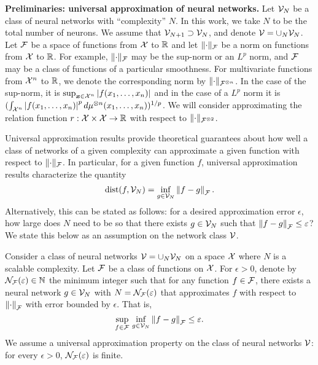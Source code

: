 \textbf{Preliminaries: universal approximation of neural networks.} Let ${\mathcal{V}}_N$ be a class of neural networks with ``complexity'' $N$. In this work, we take $N$ to be the total number of neurons. We assume that ${\mathcal{V}}_{N+1} \supset {\mathcal{V}}_N$, and denote ${\mathcal{V}} = \cup_N{{\mathcal{V}}_N}$. Let ${\mathcal{F}}$ be a space of functions from ${\mathcal{X}}$ to $\mathbb{R}$ and let $\lVert\cdot\rVert_{\mathcal{F}}$ be a norm on functions from ${\mathcal{X}}$ to $\mathbb{R}$. For example, $\lVert\cdot\rVert_{\mathcal{F}}$ may be the sup-norm or an $L^p$ norm, and ${\mathcal{F}}$ may be a class of functions of a particular smoothness. For multivariate functions from ${\mathcal{X}}^n$ to $\mathbb{R}$, we denote the corresponding norm by $\lVert\cdot\rVert_{{\mathcal{F}}^{\otimes n}}$. In the case of the sup-norm, it is $\sup_{\bm{x} \in {\mathcal{X}}^n} \left\lvert f(x_1, \ldots, x_n)\right\rvert$ and in the case of a $L^p$ norm it is $(\int_{{\mathcal{X}}^n} \left\lvert f(x_1, \ldots, x_n)\right\rvert^p d\mu^{\otimes n}(x_1, \ldots, x_n))^{1/p}$. We will consider approximating the relation function $r: {\mathcal{X}} \times {\mathcal{X}} \to \mathbb{R}$ with respect to $\lVert\cdot\rVert_{{\mathcal{F}}^{\otimes 2}}$.

Universal approximation results provide theoretical guarantees about how well a class of networks of a given complexity can approximate a given function with respect to $\lVert\cdot\rVert_{\mathcal{F}}$. In particular, for a given function $f$, universal approximation results characterize the quantity
\[\mathrm{dist}(f, {\mathcal{V}}_N) = \inf_{g \in {\mathcal{V}}_N} \left\lVert f - g\right\rVert_{{\mathcal{F}}}.\]
Alternatively, this can be stated as follows: for a desired approximation error $\epsilon$, how large does $N$ need to be so that there exists $g \in {\mathcal{V}}_N$ such that $\left\lVert f - g\right\rVert_{{\mathcal{F}}} \leq \varepsilon$? We state this below as an assumption on the network class ${\mathcal{V}}$.

\begin{assumption}\label{ass:univ_approx_efficiency}
	Consider a class of neural networks ${\mathcal{V}} = \cup_N {\mathcal{V}}_N$ on a space ${\mathcal{X}}$ where $N$ is a scalable complexity. Let ${\mathcal{F}}$ be a class of functions on ${\mathcal{X}}$. For $\epsilon > 0$, denote by ${\mathcal{N}}_{\mathcal{F}}(\varepsilon) \in \mathbb{N}$ the minimum integer such that for any function $f \in {\mathcal{F}}$, there exists a neural network $g \in {\mathcal{V}}_N$ with $N = {\mathcal{N}}_{\mathcal{F}}(\varepsilon)$ that approximates $f$ with respect to $\left\lVert\cdot\right\rVert_{\mathcal{F}}$ with error bounded by $\epsilon$. That is,
	\begin{equation*}
		\sup_{f \in \calF} \, \inf_{g \in \calV_N} \norm{f - g}_{\calF} \leq \epsilon.
	\end{equation*}
	We assume a universal approximation property on the class of neural networks ${\mathcal{V}}$: for every $\epsilon > 0$, ${\mathcal{N}}_{\mathcal{F}}(\varepsilon)$ is finite.
\end{assumption}

